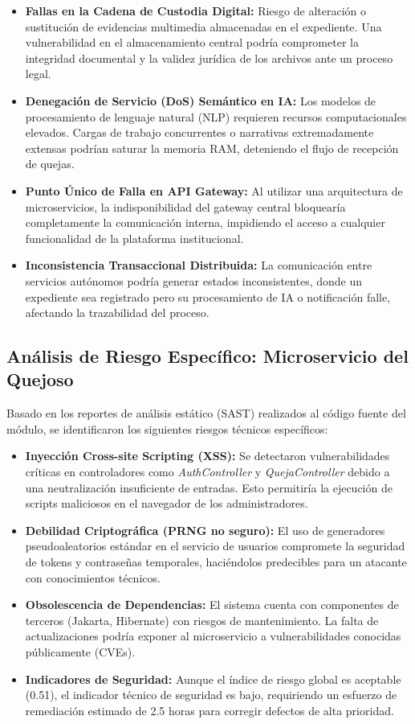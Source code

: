 \documentclass[12pt,oneside,letterpaper]{book}
\begin{document}
\begin{itemize}
    \item \textbf{Fallas en la Cadena de Custodia Digital:} Riesgo de alteración o sustitución de evidencias multimedia almacenadas en el expediente. Una vulnerabilidad en el almacenamiento central podría comprometer la integridad documental y la validez jurídica de los archivos ante un proceso legal.
    \item \textbf{Denegación de Servicio (DoS) Semántico en IA:} Los modelos de procesamiento de lenguaje natural (NLP) requieren recursos computacionales elevados. Cargas de trabajo concurrentes o narrativas extremadamente extensas podrían saturar la memoria RAM, deteniendo el flujo de recepción de quejas.
    \item \textbf{Punto Único de Falla en API Gateway:} Al utilizar una arquitectura de microservicios, la indisponibilidad del gateway central bloquearía completamente la comunicación interna, impidiendo el acceso a cualquier funcionalidad de la plataforma institucional.
    \item \textbf{Inconsistencia Transaccional Distribuida:} La comunicación entre servicios autónomos podría generar estados inconsistentes, donde un expediente sea registrado pero su procesamiento de IA o notificación falle, afectando la trazabilidad del proceso.
\end{itemize}

\subsection{Análisis de Riesgo Específico: Microservicio del Quejoso}

Basado en los reportes de análisis estático (SAST) realizados al código fuente del módulo, se identificaron los siguientes riesgos técnicos específicos:

\begin{itemize}
    \item \textbf{Inyección Cross-site Scripting (XSS):} Se detectaron vulnerabilidades críticas en controladores como \textit{AuthController} y \textit{QuejaController} debido a una neutralización insuficiente de entradas. Esto permitiría la ejecución de scripts maliciosos en el navegador de los administradores.
    \item \textbf{Debilidad Criptográfica (PRNG no seguro):} El uso de generadores pseudoaleatorios estándar en el servicio de usuarios compromete la seguridad de tokens y contraseñas temporales, haciéndolos predecibles para un atacante con conocimientos técnicos.
    \item \textbf{Obsolescencia de Dependencias:} El sistema cuenta con componentes de terceros (Jakarta, Hibernate) con riesgos de mantenimiento. La falta de actualizaciones podría exponer al microservicio a vulnerabilidades conocidas públicamente (CVEs).
    \item \textbf{Indicadores de Seguridad:} Aunque el índice de riesgo global es aceptable (0.51), el indicador técnico de seguridad es bajo, requiriendo un esfuerzo de remediación estimado de 2.5 horas para corregir defectos de alta prioridad.
\end{itemize}
\end{document}
